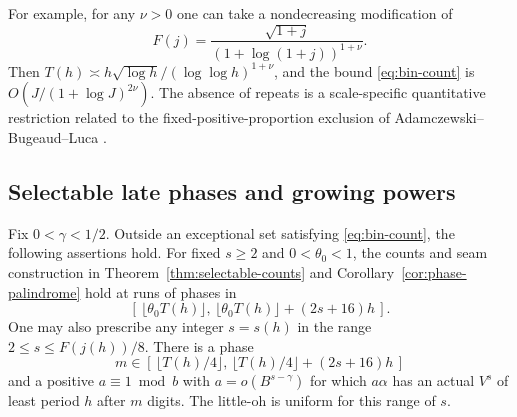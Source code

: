 For example, for any \(\nu>0\) one can take a nondecreasing
modification of
\[
 F(j)=\frac{\sqrt{1+j}}{(1+\log(1+j))^{1+\nu}}.
\]
Then \(T(h)\asymp h\sqrt{\log h}/(\log\log h)^{1+\nu}\), and
the bound \eqref{eq:bin-count} is \(O(J/(1+\log J)^{2\nu})\).
The absence of repeats is a scale-specific quantitative restriction
related to the fixed-positive-proportion exclusion of
Adamczewski--Bugeaud--Luca \cite[Theorem~3.3]{Bilu}.

\subsection{Selectable late phases and growing powers}

\begin{theorem}\label{thm:growing-power}
Fix \(0<\gamma<1/2\). Outside an exceptional set satisfying
\eqref{eq:bin-count}, the following assertions hold.
For fixed \(s\ge2\) and \(0<\theta_0<1\), the counts and seam
construction in Theorem~\ref{thm:selectable-counts} and
Corollary~\ref{cor:phase-palindrome} hold at runs of phases in
\[
 [\,\lfloor\theta_0T(h)\rfloor,\,
       \lfloor\theta_0T(h)\rfloor+(2s+16)h\,].
\]
One may also prescribe any integer \(s=s(h)\) in the range
\(2\le s\le F(j(h))/8\). There is a phase
\begin{equation}\label{eq:growing-phase-window}
 m\in[\,\lfloor T(h)/4\rfloor,\,\lfloor T(h)/4\rfloor+(2s+16)h\,]
\end{equation}
and a positive \(a\equiv1\bmod b\) with
\(a=o(B^{s-\gamma})\) for which \(a\alpha\) has an actual
\(V^s\) of least period \(h\) after \(m\) digits.
The little-oh is uniform for this range of \(s\).
\end{theorem}

